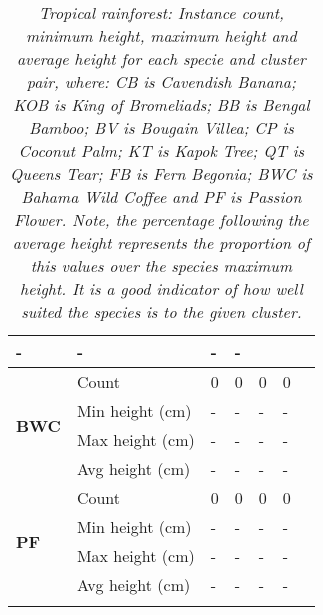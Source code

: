 \begin{longtable}{|p{2cm}|p{2cm}|p{2cm}|p{2cm}|p{2cm}|p{2cm}|p{2cm}|}
						\multicolumn{1}{l|}{-} & 
						\multicolumn{1}{l|}{-} &
						\multicolumn{1}{l|}{-} & 
						\multicolumn{1}{l|}{-} \\\cline{2-7}
		\hline    
		\multirow{4}{*}{\textbf{BWC}} & 
						\multicolumn{1}{l|}{Count} & 
						\multicolumn{1}{l|}{0} & 
						\multicolumn{1}{l|}{0} &
						\multicolumn{1}{l|}{0} & 
						\multicolumn{1}{l|}{0} \\\cline{2-7} &
						\multicolumn{1}{l|}{Min height (cm)} & 
						\multicolumn{1}{l|}{-} & 
						\multicolumn{1}{l|}{-} &
						\multicolumn{1}{l|}{-} & 
						\multicolumn{1}{l|}{-} \\\cline{2-7} &
						\multicolumn{1}{l|}{Max height (cm)} & 
						\multicolumn{1}{l|}{-} & 
						\multicolumn{1}{l|}{-} &
						\multicolumn{1}{l|}{-} & 
						\multicolumn{1}{l|}{-} \\\cline{2-7} &
						\multicolumn{1}{l|}{Avg height (cm)} & 
						\multicolumn{1}{l|}{-} & 
						\multicolumn{1}{l|}{-} &
						\multicolumn{1}{l|}{-} & 
						\multicolumn{1}{l|}{-} \\\cline{2-7}
		\hline    
		\multirow{4}{*}{\textbf{PF}} & 
						\multicolumn{1}{l|}{Count} & 
						\multicolumn{1}{l|}{0} & 
						\multicolumn{1}{l|}{0} &
						\multicolumn{1}{l|}{0} & 
						\multicolumn{1}{l|}{0} \\\cline{2-7} &
						\multicolumn{1}{l|}{Min height (cm)} & 
						\multicolumn{1}{l|}{-} & 
						\multicolumn{1}{l|}{-} &
						\multicolumn{1}{l|}{-} & 
						\multicolumn{1}{l|}{-} \\\cline{2-7} &
						\multicolumn{1}{l|}{Max height (cm)} & 
						\multicolumn{1}{l|}{-} & 
						\multicolumn{1}{l|}{-} &
						\multicolumn{1}{l|}{-} & 
						\multicolumn{1}{l|}{-} \\\cline{2-7} &
						\multicolumn{1}{l|}{Avg height (cm)} & 
						\multicolumn{1}{l|}{-} & 
						\multicolumn{1}{l|}{-} &
						\multicolumn{1}{l|}{-} & 
						\multicolumn{1}{l|}{-} \\\cline{2-7}
		\hline                                                
	\caption{\textit{Tropical rainforest: Instance count, minimum height, maximum height and average height for each specie and cluster pair, where: CB is Cavendish Banana; KOB is King of Bromeliads; BB is Bengal Bamboo; BV is Bougain Villea; CP is Coconut Palm; KT is Kapok Tree; QT is Queens Tear; FB is Fern Begonia; BWC is Bahama Wild Coffee and PF is Passion Flower. Note, the percentage following the average height represents the proportion of this values over the species maximum height. It is a good indicator of how well suited the species is to the given cluster.}}
	\label{tab:results_tropical_big_species_cluster_properties}	
\end{longtable}

